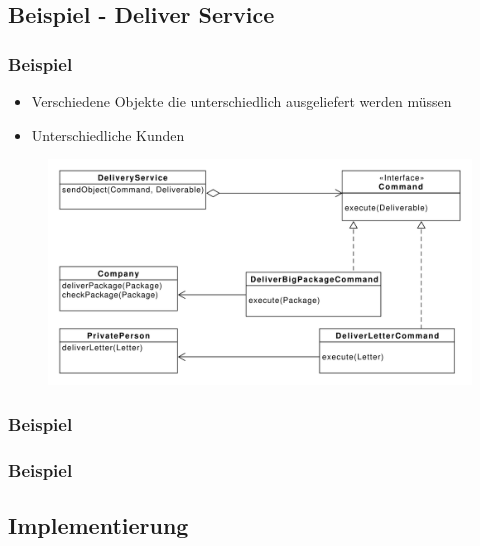 \subsection{Beispiel - Deliver Service}
\begin{frame}
	\frametitle{Beispiel}
	\begin{itemize}
		\item Verschiedene Objekte die unterschiedlich ausgeliefert werden müssen
		\item Unterschiedliche Kunden
	\end{itemize}	
	
  	\begin{figure}
		\includegraphics[scale=.4]{paper/command/DeliverService}
	\end{figure}
\end{frame}


\begin{frame}
	\frametitle{Beispiel}
  	\begin{figure}
	\end{figure}
\end{frame}

\begin{frame}
	\frametitle{Beispiel}
  	\begin{figure}
	\end{figure}
\end{frame}

\subsection{Implementierung}

